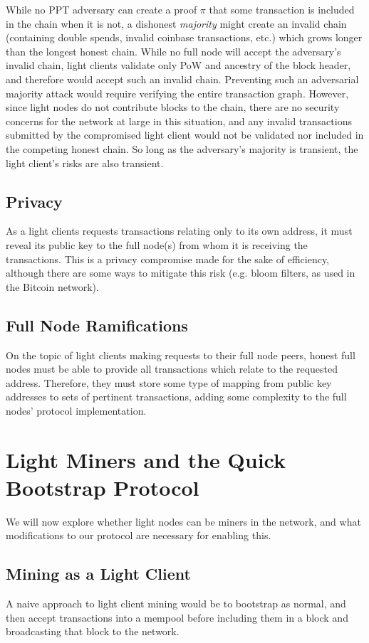 While no PPT adversary can create a proof $\pi$ that some transaction is included in the chain when it is not, a dishonest \textit{majority} might create an invalid chain (containing double spends, invalid coinbase transactions, etc.) which grows longer than the longest honest chain. While no full node will accept the adversary's invalid chain, light clients validate only PoW and ancestry of the block header, and therefore would accept such an invalid chain. Preventing such an adversarial majority attack would require verifying the entire transaction graph. However, since light nodes do not contribute blocks to the chain, there are no security concerns for the network at large in this situation, and any invalid transactions submitted by the compromised light client would not be validated nor included in the competing honest chain. So long as the adversary's majority is transient, the light client's risks are also transient.

\subsection{Privacy}
As a light clients requests transactions relating only to its own address, it must reveal its public key to the full node(s) from whom it is receiving the transactions. This is a privacy compromise made for the sake of efficiency, although there are some ways to mitigate this risk (e.g. bloom filters, as used in the Bitcoin network).

\subsection{Full Node Ramifications}
On the topic of light clients making requests to their full node peers, honest full nodes must be able to provide all transactions which relate to the requested address. Therefore, they must store some type of mapping from public key addresses to sets of pertinent transactions, adding some complexity to the full nodes' protocol implementation.


\section{Light Miners and the Quick Bootstrap Protocol}
We will now explore whether light nodes can be miners in the network, and what modifications to our protocol are necessary for enabling this.

\subsection{Mining as a Light Client}
A naive approach to light client mining would be to bootstrap as normal, and then accept transactions into a mempool before including them in a block and broadcasting that block to the network.

